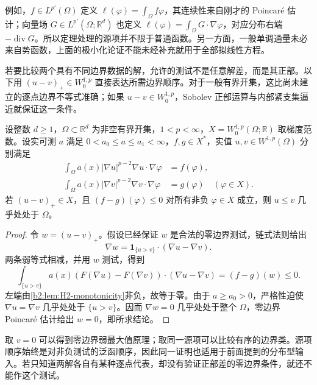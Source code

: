 例如，\(f\in L^{p'}(\Omega)\) 定义 \(\ell(\varphi)=\int_\Omega f\varphi\)，其连续性来自刚才的 Poincaré 估计；向量场 \(G\in L^{p'}(\Omega;\mathbb R^d)\) 也定义 \(\ell(\varphi)=\int_\Omega G\cdot\nabla\varphi\)，对应分布右端 \(-\operatorname{div}G\)。所以定理处理的源项并不限于普通函数。另一方面，一般单调通量未必来自势函数，上面的极小化论证不能未经补充就用于全部拟线性方程。

\ProseParagraphBreak

若要比较两个具有不同边界数据的解，允许的测试不是任意解差，而是其正部。以下用 \((u-v)_+\in W_0^{1,p}\) 直接表达所需边界顺序。对于一般有界开集，这比尚未建立的逐点边界不等式准确；如果 \(u-v\in W_0^{1,p}\)，Sobolev 正部运算与内部紧支集逼近就保证这一条件。

\begin{proposition}[非线性能量解的比较原理]
\label{b2:prop:H2-comparison}
设整数 \(d\ge1\)，\(\Omega\subset\mathbb R^d\) 为非空有界开集，\(1<p<\infty\)，\(X=W_0^{1,p}(\Omega;\mathbb R)\) 取梯度范数。设实可测 \(a\) 满足 \(0<a_0\le a\le a_1<\infty\)，\(f,g\in X^*\)，实值 \(u,v\in W^{1,p}(\Omega)\) 分别满足
\[
 \begin{aligned}
 \int_\Omega a(x)|\nabla u|^{p-2}\nabla u\cdot\nabla\varphi&=f(\varphi),\\
 \int_\Omega a(x)|\nabla v|^{p-2}\nabla v\cdot\nabla\varphi&=g(\varphi)
 \quad(\varphi\in X).
 \end{aligned}
\]
若 \((u-v)_+\in X\)，且 \((f-g)(\varphi)\le0\) 对所有非负 \(\varphi\in X\) 成立，则 \(u\le v\) 几乎处处于 \(\Omega\)。
\end{proposition}
\begin{proof}
令 \(w=(u-v)_+\)。假设已经保证 \(w\) 是合法的零边界测试，链式法则给出
\[
 \nabla w=\mathbf1_{\{u>v\}}\cdot(\nabla u-\nabla v).
\]
两条弱等式相减，并用 \(w\) 测试，得到
\[
 \int_{\{u>v\}}a(x)
   (F(\nabla u)-F(\nabla v))\cdot(\nabla u-\nabla v)
   =(f-g)(w)\le0.
\]
左端由\cref{b2:lem:H2-monotonicity}非负，故等于零。由于 \(a\ge a_0>0\)，严格性迫使 \(\nabla u=\nabla v\) 几乎处处于 \(\{u>v\}\)。因而 \(\nabla w=0\) 几乎处处于整个 \(\Omega\)，零边界 Poincaré 估计给出 \(w=0\)，即所求结论。
\end{proof}

取 \(v=0\) 可以得到零边界弱最大值原理；取同一源项可以比较有序的边界类。源项顺序始终是对非负测试的泛函顺序，因此同一证明也适用于前面提到的分布型输入。若只知道两解各自有某种逐点代表，却没有验证正部差的零边界条件，就还不能作这个测试。

